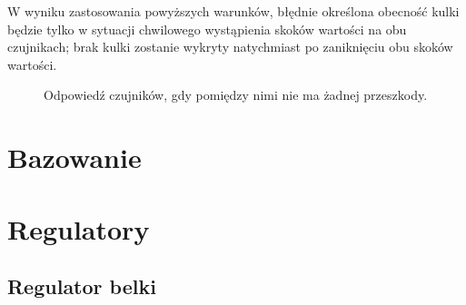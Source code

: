W wyniku zastosowania powyższych warunków, błędnie określona obecność kulki będzie tylko w sytuacji chwilowego wystąpienia skoków wartości na obu czujnikach; brak kulki zostanie wykryty natychmiast po zaniknięciu obu skoków wartości.

\begin{figure}[ht]
    \centering
        
    \caption{Odpowiedź czujników, gdy pomiędzy nimi nie ma żadnej przeszkody.}
    \label{fig:czujniki_charakterystyka_bez_przeszkody}
\end{figure}

\section{Bazowanie}
\label{sec:ch7_bazowanie}


\section{Regulatory}
\label{sec:ch7_regulatory}


\subsection{Regulator belki}
\label{subsec:ch7_regulator_belki}
